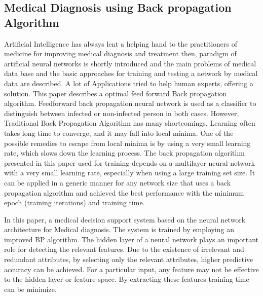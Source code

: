 \subsection{Medical Diagnosis using Back propagation Algorithm}
Artificial Intelligence has always lent a helping hand to the practitioners of medicine for improving medical diagnosis and treatment then, paradigm of artificial neural networks is shortly introduced and the main problems of medical data base and the basic approaches for training and testing a network by medical data are described. A lot of Applications tried to help
human experts, offering a solution. This paper describes a
optimal feed forward Back propagation algorithm. Feedforward back propagation neural network is used as a classifier to distinguish between infected or non-infected person in both cases. However, Traditional Back Propagation Algorithm has many shortcomings. Learning often takes long time to converge, and it may fall into local minima. One of the possible remedies to escape from local minima is by using a very small learning rate, which slows down the learning process. The back propagation algorithm presented in this paper used for training
depends on a multilayer neural network with a very small
learning rate, especially when using a large training set
size. It can be applied in a generic manner for any
network size that uses a back propagation algorithm and
achieved the best performance with the minimum epoch
(training iterations) and training time. \par

In this paper, a medical decision support system based on the neural network architecture for Medical diagnosis. The system is trained by employing an improved BP algorithm. The
hidden layer of a neural network plays an important
role for detecting the relevant features. Due to the
existence of irrelevant and redundant attributes, by
selecting only the relevant attributes, higher predictive
accuracy can be achieved. For a particular input, any
feature may not be effective to the hidden
layer or feature space. By extracting these
features training time can be minimize. 
